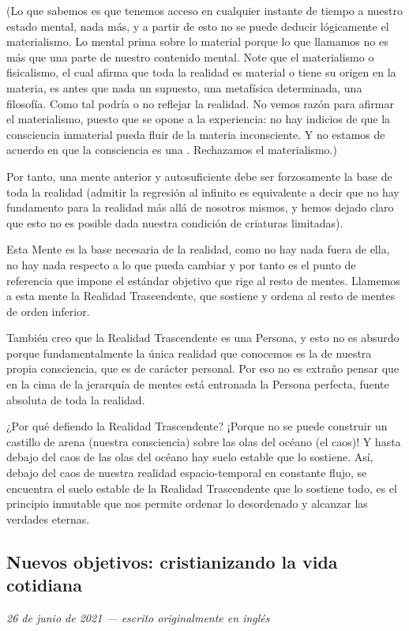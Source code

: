 \documentclass[12pt]{article}
\begin{document}
	(Lo que sabemos es que tenemos acceso en cualquier instante de tiempo a
	nuestro estado mental, nada más, y a partir de esto no se puede deducir
	lógicamente el materialismo. Lo mental prima sobre lo material porque lo
	que llamamos  no es más que una parte de nuestro
	contenido
	mental. Note que el materialismo o fisicalismo, el cual afirma que toda
	la realidad es material o tiene su origen en la materia, es antes que
	nada un supuesto, una metafísica determinada, una filosofía. Como tal
	podría o no reflejar la realidad. No vemos razón para afirmar el
	materialismo, puesto que se opone a la experiencia: no hay indicios de
	que la consciencia inmaterial pueda fluir de la materia inconsciente. Y
	no estamos de acuerdo en que la consciencia es una .
	Rechazamos el materialismo.)
	
	Por tanto, una mente anterior y autosuficiente debe ser forzosamente la
	base de toda la realidad (admitir la regresión al infinito es
	equivalente a decir que no hay fundamento para la realidad más allá de
	nosotros mismos, y hemos dejado claro que esto no es posible dada
	nuestra condición de criaturas limitadas).

	Esta Mente es la base necesaria de la realidad, como no hay nada fuera
	de ella, no hay nada respecto a lo que pueda cambiar y por tanto es el
	punto de referencia que impone el estándar objetivo que rige al resto de
	mentes. Llamemos a esta mente la Realidad Trascendente, que sostiene y
	ordena al resto de mentes de orden inferior.
	
	También creo que la Realidad Trascendente es una Persona, y esto no es
	absurdo porque fundamentalmente la única realidad que conocemos es la de
	nuestra propia consciencia, que es de carácter personal. Por eso no es
	extraño pensar que en la cima de la jerarquía de mentes está entronada
	la Persona perfecta, fuente absoluta de toda la realidad.
	
	¿Por qué defiendo la Realidad Trascendente? ¡Porque no se puede
	construir un castillo de arena (nuestra consciencia) sobre las olas del
	océano (el caos)! Y hasta debajo del caos de las olas del océano hay
	suelo estable que lo sostiene. Así, debajo del caos de nuestra realidad
	espacio-temporal en constante flujo, se encuentra el suelo estable de la
	Realidad Trascendente que lo sostiene todo, es el principio inmutable
	que nos permite ordenar lo desordenado y alcanzar las verdades eternas.

	\newpage
\subsection{Nuevos objetivos: cristianizando la vida cotidiana}
	\textit{26 de junio de 2021 --- escrito originalmente en inglés}\\
\end{document}
